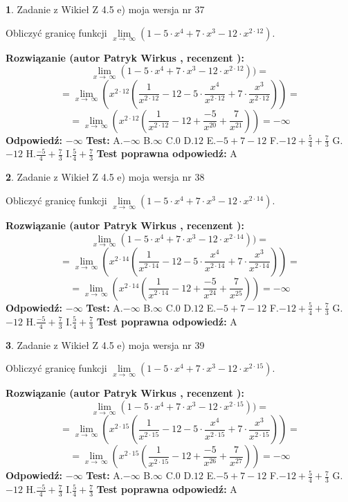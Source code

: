 \documentclass[12pt, a4paper]{article}
\theoremstyle{definition} %
\newtheorem{zad}{}
\newcommand{\zadStart}[1]{\begin{zad}#1\newline}
\newcommand{\zadStop}{\end{zad}}
\newcommand{\rozwStart}[2]{\noindent \textbf{Rozwiązanie (autor #1 , recenzent #2): }\newline}
\newcommand{\rozwStop}{\newline}
\newcommand{\odpStart}{\noindent \textbf{Odpowiedź:}\newline}
\newcommand{\odpStop}{\newline}
\newcommand{\testStart}{\noindent \textbf{Test:}\newline}
\newcommand{\testStop}{\newline}
\newcommand{\kluczStart}{\noindent \textbf{Test poprawna odpowiedź:}\newline}
\newcommand{\kluczStop}{\newline}
\begin{document}
\zadStart{Zadanie z Wikieł Z 4.5 e) moja wersja nr 37}



Obliczyć granicę funkcji  $\lim\limits_{x\to\ \infty}(1 - 5 \cdot x^{4}+7 \cdot x^{3}- 12 \cdot x^{2\cdot12})$.
\zadStop
\rozwStart{Patryk Wirkus}{}
$$\lim\limits_{x\to\ \infty}(1 - 5 \cdot x^{4}+7 \cdot x^{3}- 12 \cdot x^{2\cdot12}))=$$
$$=\lim\limits_{x\to\ \infty}(x^{2\cdot12}(\frac{1}{x^{2\cdot12}}-12 -5 \cdot \frac{x^{4}}{x^{2\cdot12}}+7 \cdot \frac{x^{3}}{x^{2\cdot12}}))=$$
$$=\lim\limits_{x\to\ \infty}(x^{2\cdot12}(\frac{1}{x^{2\cdot12}}-12 + \frac{-5}{x^{20}}+ \frac{7}{x^{21}}))=-\infty$$
\rozwStop
\odpStart
$-\infty$
\odpStop
\testStart
A.$-\infty$ B.$\infty$ C.$0$ D.$12$ E.$-5 + 7 - 12$
F.$-12+\frac{5}{4}+\frac{7}{3}$ G.$-12$
H.$\frac{-5}{4}+\frac{7}{3}$
I.$\frac{5}{4}+\frac{7}{3}$
\testStop
\kluczStart
A
\kluczStop



\zadStart{Zadanie z Wikieł Z 4.5 e) moja wersja nr 38}



Obliczyć granicę funkcji  $\lim\limits_{x\to\ \infty}(1 - 5 \cdot x^{4}+7 \cdot x^{3}- 12 \cdot x^{2\cdot14})$.
\zadStop
\rozwStart{Patryk Wirkus}{}
$$\lim\limits_{x\to\ \infty}(1 - 5 \cdot x^{4}+7 \cdot x^{3}- 12 \cdot x^{2\cdot14}))=$$
$$=\lim\limits_{x\to\ \infty}(x^{2\cdot14}(\frac{1}{x^{2\cdot14}}-12 -5 \cdot \frac{x^{4}}{x^{2\cdot14}}+7 \cdot \frac{x^{3}}{x^{2\cdot14}}))=$$
$$=\lim\limits_{x\to\ \infty}(x^{2\cdot14}(\frac{1}{x^{2\cdot14}}-12 + \frac{-5}{x^{24}}+ \frac{7}{x^{25}}))=-\infty$$
\rozwStop
\odpStart
$-\infty$
\odpStop
\testStart
A.$-\infty$ B.$\infty$ C.$0$ D.$12$ E.$-5 + 7 - 12$
F.$-12+\frac{5}{4}+\frac{7}{3}$ G.$-12$
H.$\frac{-5}{4}+\frac{7}{3}$
I.$\frac{5}{4}+\frac{7}{3}$
\testStop
\kluczStart
A
\kluczStop



\zadStart{Zadanie z Wikieł Z 4.5 e) moja wersja nr 39}



Obliczyć granicę funkcji  $\lim\limits_{x\to\ \infty}(1 - 5 \cdot x^{4}+7 \cdot x^{3}- 12 \cdot x^{2\cdot15})$.
\zadStop
\rozwStart{Patryk Wirkus}{}
$$\lim\limits_{x\to\ \infty}(1 - 5 \cdot x^{4}+7 \cdot x^{3}- 12 \cdot x^{2\cdot15}))=$$
$$=\lim\limits_{x\to\ \infty}(x^{2\cdot15}(\frac{1}{x^{2\cdot15}}-12 -5 \cdot \frac{x^{4}}{x^{2\cdot15}}+7 \cdot \frac{x^{3}}{x^{2\cdot15}}))=$$
$$=\lim\limits_{x\to\ \infty}(x^{2\cdot15}(\frac{1}{x^{2\cdot15}}-12 + \frac{-5}{x^{26}}+ \frac{7}{x^{27}}))=-\infty$$
\rozwStop
\odpStart
$-\infty$
\odpStop
\testStart
A.$-\infty$ B.$\infty$ C.$0$ D.$12$ E.$-5 + 7 - 12$
F.$-12+\frac{5}{4}+\frac{7}{3}$ G.$-12$
H.$\frac{-5}{4}+\frac{7}{3}$
I.$\frac{5}{4}+\frac{7}{3}$
\testStop
\kluczStart
A
\kluczStop
\end{document}
